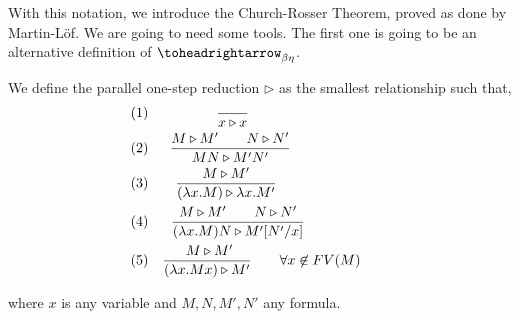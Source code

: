 With this notation, we introduce the Church-Rosser Theorem, proved as done by Martin-Löf. We are going to need some tools. The first one is going to be an alternative definition of $\toheadrightarrow_{\beta\eta}$.
\begin{definition}
  We define the parallel one-step reduction  $\triangleright$ as the smallest relationship such that,\\
\begin{align*}
(1)&& {\displaystyle \over x \triangleright x}\qquad\qquad\qquad\qquad\qquad\\
 (2)&& { M \triangleright M'\qquad N\triangleright N'  \over MN \triangleright M'N' }\qquad\qquad\qquad\ \  \ \\
 (3)&&{M \triangleright M' \over(\lambda x.M) \triangleright \lambda x.M'}\qquad\qquad\qquad\qquad\\
 (4)&& {M \triangleright M'\qquad N \triangleright N' \over (\lambda x.M)N \triangleright M'[N'/x]}\qquad\qquad\qquad\\
  (5)&& {\ M\triangleright M'\over(\lambda x.Mx) \triangleright M'} \qquad \forall x \not  \in FV(M)\qquad
\end{align*}



where $x$ is any variable and $M,N,M',N'$ any formula.
\end{definition}

